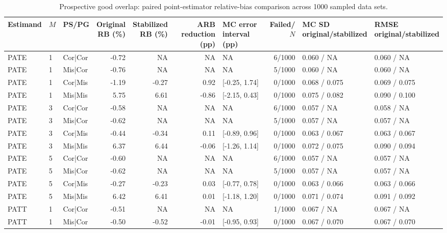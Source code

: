 \begin{table}
\centering\footnotesize
\caption{Prospective good overlap: paired point-estimator relative-bias comparison across 1000 sampled data sets.}
\setlength{\tabcolsep}{3pt}
\renewcommand{\arraystretch}{1.12}
\begin{tabular}{lllr r r l r l l}
\toprule
Estimand & $M$ & PS/PG & \shortstack{Original\\RB (\%)} & \shortstack{Stabilized\\RB (\%)} & \shortstack{ARB reduction\\(pp)} & \shortstack{MC error interval\\(pp)} & Failed/$N$ & \shortstack{MC SD\\original/stabilized} & \shortstack{RMSE\\original/stabilized} \\
\midrule
PATE & 1 & Cor|Cor & -0.72 & NA & NA & NA & 6/1000 & 0.060 / NA & 0.060 / NA \\
PATE & 1 & Mis|Cor & -0.76 & NA & NA & NA & 5/1000 & 0.060 / NA & 0.060 / NA \\
PATE & 1 & Cor|Mis & -1.19 & -0.27 & 0.92 & [-0.25, 1.74] & 0/1000 & 0.068 / 0.075 & 0.069 / 0.075 \\
PATE & 1 & Mis|Mis & 5.75 & 6.61 & -0.86 & [-2.15, 0.43] & 0/1000 & 0.075 / 0.082 & 0.090 / 0.100 \\
PATE & 3 & Cor|Cor & -0.58 & NA & NA & NA & 6/1000 & 0.057 / NA & 0.058 / NA \\
PATE & 3 & Mis|Cor & -0.62 & NA & NA & NA & 5/1000 & 0.057 / NA & 0.057 / NA \\
PATE & 3 & Cor|Mis & -0.44 & -0.34 & 0.11 & [-0.89, 0.96] & 0/1000 & 0.063 / 0.067 & 0.063 / 0.067 \\
PATE & 3 & Mis|Mis & 6.37 & 6.44 & -0.06 & [-1.26, 1.14] & 0/1000 & 0.072 / 0.075 & 0.090 / 0.094 \\
PATE & 5 & Cor|Cor & -0.60 & NA & NA & NA & 6/1000 & 0.057 / NA & 0.057 / NA \\
PATE & 5 & Mis|Cor & -0.62 & NA & NA & NA & 5/1000 & 0.057 / NA & 0.057 / NA \\
PATE & 5 & Cor|Mis & -0.27 & -0.23 & 0.03 & [-0.77, 0.78] & 0/1000 & 0.063 / 0.066 & 0.063 / 0.066 \\
PATE & 5 & Mis|Mis & 6.42 & 6.41 & 0.01 & [-1.18, 1.20] & 0/1000 & 0.071 / 0.074 & 0.091 / 0.092 \\
PATT & 1 & Cor|Cor & -0.51 & NA & NA & NA & 1/1000 & 0.067 / NA & 0.067 / NA \\
PATT & 1 & Mis|Cor & -0.50 & -0.52 & -0.01 & [-0.95, 0.93] & 0/1000 & 0.067 / 0.070 & 0.067 / 0.070 \\

\end{tabular}
\end{table}

